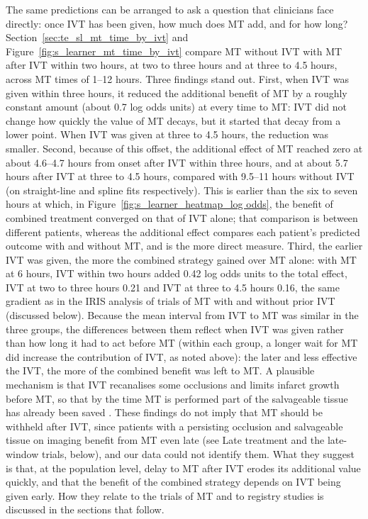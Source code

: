 The same predictions can be arranged to ask a question that clinicians face directly: once IVT has been given, how much does MT add, and for how long? Section~\ref{sec:te_sl_mt_time_by_ivt} and Figure~\ref{fig:s_learner_mt_time_by_ivt} compare MT without IVT with MT after IVT within two hours, at two to three hours and at three to 4.5 hours, across MT times of 1--12 hours. Three findings stand out. First, when IVT was given within three hours, it reduced the additional benefit of MT by a roughly constant amount (about 0.7 log odds units) at every time to MT: IVT did not change how quickly the value of MT decays, but it started that decay from a lower point. When IVT was given at three to 4.5 hours, the reduction was smaller. Second, because of this offset, the additional effect of MT reached zero at about 4.6--4.7 hours from onset after IVT within three hours, and at about 5.7 hours after IVT at three to 4.5 hours, compared with 9.5--11 hours without IVT (on straight-line and spline fits respectively). This is earlier than the six to seven hours at which, in Figure~\ref{fig:s_learner_heatmap_log odds}, the benefit of combined treatment converged on that of IVT alone; that comparison is between different patients, whereas the additional effect compares each patient's predicted outcome with and without MT, and is the more direct measure. Third, the earlier IVT was given, the more the combined strategy gained over MT alone: with MT at 6 hours, IVT within two hours added 0.42 log odds units to the total effect, IVT at two to three hours 0.21 and IVT at three to 4.5 hours 0.16, the same gradient as in the IRIS analysis of trials of MT with and without prior IVT (discussed below). Because the mean interval from IVT to MT was similar in the three groups, the differences between them reflect when IVT was given rather than how long it had to act before MT (within each group, a longer wait for MT did increase the contribution of IVT, as noted above): the later and less effective the IVT, the more of the combined benefit was left to MT. A plausible mechanism is that IVT recanalises some occlusions and limits infarct growth before MT, so that by the time MT is performed part of the salvageable tissue has already been saved . These findings do not imply that MT should be withheld after IVT, since patients with a persisting occlusion and salvageable tissue on imaging benefit from MT even late (see Late treatment and the late-window trials, below), and our data could not identify them. What they suggest is that, at the population level, delay to MT after IVT erodes its additional value quickly, and that the benefit of the combined strategy depends on IVT being given early. How they relate to the trials of MT and to registry studies is discussed in the sections that follow.

